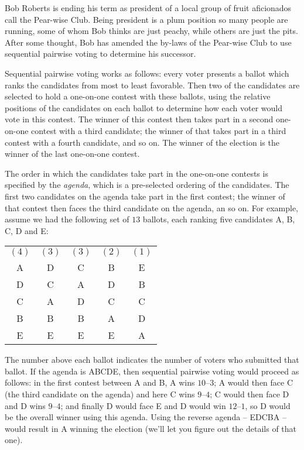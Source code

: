 
Bob Roberts is ending his term as president of a local group of fruit aficionados call the Pear-wise Club.  Being president is a plum position so many people are running, some of whom Bob thinks are just peachy, while others are just the pits.  After some thought, Bob has amended the by-laws of the Pear-wise Club to use sequential pairwise voting to determine his successor.

Sequential pairwise voting works as follows:  every voter presents a ballot which ranks the candidates from most to least favorable.  Then two of the candidates are selected to hold a one-on-one contest with these ballots, using the relative positions of the candidates on each ballot to determine how each voter would vote in this contest.  The winner of this contest then takes part in a second one-on-one contest with a third candidate; the winner of that takes part in a third contest with a fourth candidate, and so on.  The winner of the election is the winner of the last one-on-one contest.

The order in which the candidates take part in the one-on-one contests is specified by the {\em agenda}, which is a pre-selected ordering of the candidates.  The first two candidates on the agenda take part in the first contest; the winner of that contest then faces the third candidate on the agenda, an so on.  For example, assume we had the following set of $13$ ballots, each ranking five candidates A, B, C, D and E:
\begin{center}
\begin{tabular}{ccccc}
$(4)$ & $(3)$ & $(3)$ & $(2)$ & $(1)$ \\
A & D & C & B & E \\
D & C & A & D & B \\
C & A & D & C & C \\
B & B & B & A & D \\
E & E & E & E & A
\end{tabular}
\end{center}
The number above each ballot indicates the number of voters who submitted that ballot.  If the agenda is ABCDE, then sequential pairwise voting would proceed as follows: in the first contest between A and B, A wins $10$--$3$; A would then face C (the third candidate on the agenda) and here C wins $9$--$4$; C would then face D and D wins $9$--$4$; and finally D would face E and D would win $12$--$1$, so D would be the overall winner using this agenda.  Using the reverse agenda -- EDCBA -- would result in A winning the election (we'll let you figure out the details of that one).

